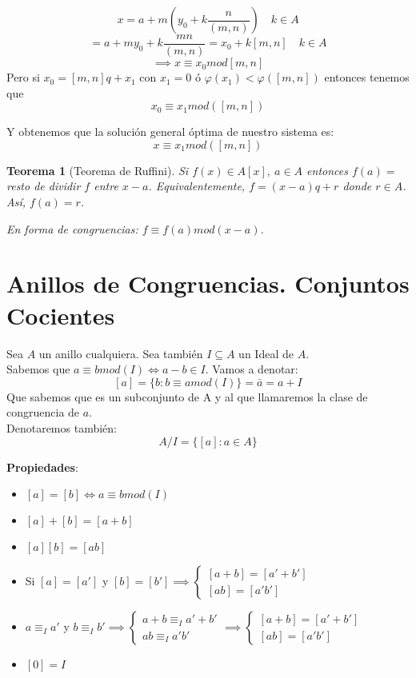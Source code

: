 \documentclass[11pt, a4paper, titlepage]{article}
\makeatletter
\renewenvironment{proof}[1][\proofname] {\vspace{-15pt}\par\pushQED{\qed}\normalfont\topsep6\p@\@plus6\p@\relax\trivlist\item[\hskip\labelsep\it#1\@addpunct{.}]\ignorespaces}{\popQED\endtrivlist\@endpefalse}
\theoremstyle{theorem-style}
\newtheorem*{nth}{Teorema}
\theoremstyle{definition-style}
\theoremstyle{remark-style}
\theoremstyle{example-style}
\makeatother
\begin{document}
\[
x = a +m(y_0 +  k\frac{n}{(m,n)}) \quad k \in A
\]
\[
 = a+my_0 + k \frac{mn}{(m,n)} = x_0 +k[m,n] \quad k \in A
\]
\[
\implies x \equiv x_0 mod [m,n]
\]
Pero si $x_0 = [m,n]q + x_1$ con $x_1 = 0 $ ó $\varphi(x_1) < \varphi([m,n])$ entonces tenemos que $$x_0 \equiv x_1 mod([m,n])$$

Y obtenemos que la solución general óptima de nuestro sistema es:
\[
x \equiv x_1 mod([m,n])
\]


\begin{nth}[Teorema de Ruffini]
	Si $f(x) \in A[x], \ a \in A$ entonces $f(a) =$ resto de dividir $f$ entre $x-a$.
	Equivalentemente, $f = (x-a)q+r$ donde $r\in A$. Así, $f(a) = r$.
	
	En forma de congruencias: $f \equiv f(a)mod(x-a)$.
\end{nth}
\section{Anillos de Congruencias. Conjuntos Cocientes}

Sea $A$ un anillo cualquiera. Sea también $I \subseteq A$ un Ideal de $A$.\\
Sabemos que $a \equiv b mod(I) \iff a-b \in I$. Vamos a denotar:
\[
[a] = \{ b: b\equiv a mod(I)\} = \bar{a} = a + I
\]
Que sabemos que es un subconjunto de A y al que llamaremos la clase de congruencia de $a$.\\
Denotaremos también:
\[
 A/I = \{[a]: a \in A\}
\]


\textbf{Propiedades}:\\
\begin{itemize}
	\item $  [a]=[b] \iff a \equiv b mod (I) $
	\item $[a] + [b] = [a+b]$
	\item $[a][b] = [ab] $
	\item Si $[a] = [a']$ y $[b] = [b'] \implies \begin{cases}
	[a+b] = [a' +b']\\
	[ab] = [a'b']
\end{cases}$\\

\begin{proof}
	$a\equiv_I a'$ y $b \equiv_I b' \implies \begin{cases}
	a+b \equiv_I a'+b'\\
	ab \equiv_I a'b'
\end{cases}\implies \begin{cases}
	[a+b] = [a'+b']\\
	[ab] = [a'b']
\end{cases}$
\end{proof}
	\item $[0] = I$
\end{itemize}
\end{document}

